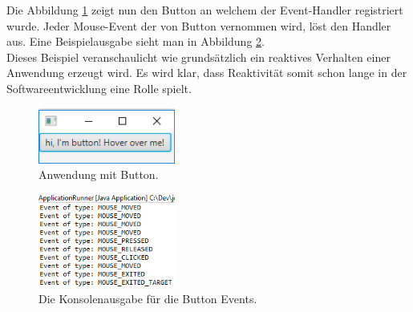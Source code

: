 
Die Abbildung \ref{pic:buttonapp} zeigt nun den Button an welchem der Event-Handler registriert wurde. Jeder Mouse-Event der von Button vernommen wird, löst den Handler aus. Eine Beispielausgabe sieht man in Abbildung \ref{pic:consoleoutput}. \\ Dieses Beispiel veranschaulicht wie grundsätzlich ein reaktives Verhalten einer Anwendung erzeugt wird. Es wird klar, dass Reaktivität somit schon lange in der Softwareentwicklung eine Rolle spielt.
\begin{figure}
	\centering
	\includegraphics[width=0.4\textwidth]{Abb/buttonapp.PNG}
	\caption{Anwendung mit Button.}
	\label{pic:buttonapp}
\end{figure}
\begin{figure}
	\centering
	\includegraphics[width=0.4\textwidth]{Abb/consoleoutput.PNG}
	\caption{Die Konsolenausgabe für die Button Events.}
	\label{pic:consoleoutput}
\end{figure}
